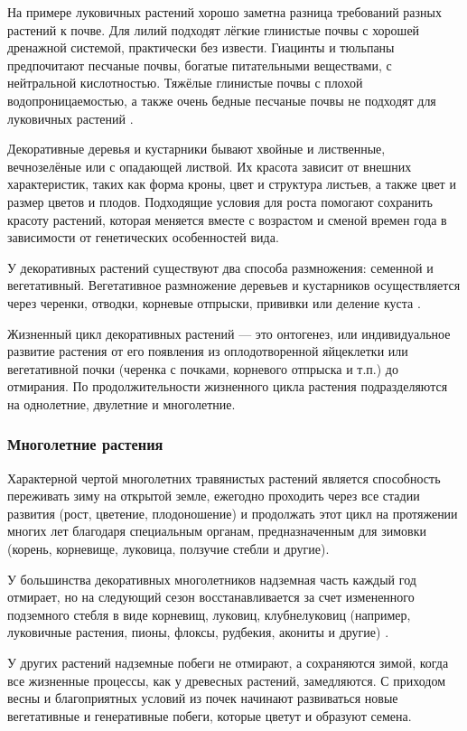 На примере луковичных растений хорошо заметна разница требований разных растений к почве. Для лилий подходят лёгкие глинистые почвы с хорошей дренажной системой, практически без извести. Гиацинты и тюльпаны предпочитают песчаные почвы, богатые питательными веществами, с нейтральной кислотностью. Тяжёлые глинистые почвы с плохой водопроницаемостью, а также очень бедные песчаные почвы не подходят для луковичных растений \cite{doroshenko}.

Декоративные деревья и кустарники бывают хвойные и лиственные, вечнозелёные или с опадающей листвой. Их красота зависит от внешних характеристик, таких как форма кроны, цвет и структура листьев, а также цвет и размер цветов и плодов. Подходящие условия для роста помогают сохранить красоту растений, которая меняется вместе с возрастом и сменой времен года в зависимости от генетических особенностей вида.

У декоративных растений существуют два способа размножения: семенной и вегетативный. Вегетативное размножение деревьев и кустарников осуществляется через черенки, отводки, корневые отпрыски, прививки или деление куста \cite{berd}.

Жизненный цикл декоративных растений — это онтогенез, или индивидуальное развитие растения от его появления из оплодотворенной яйцеклетки или вегетативной почки (черенка с почками, корневого отпрыска и т.п.) до отмирания. По продолжительности жизненного цикла растения подразделяются на однолетние, двулетние и многолетние.

\subsubsection{Многолетние растения}

Характерной чертой многолетних травянистых растений является способность переживать зиму на открытой земле, ежегодно проходить через все стадии развития (рост, цветение, плодоношение) и продолжать этот цикл на протяжении многих лет благодаря специальным органам, предназначенным для зимовки (корень, корневище, луковица, ползучие стебли и другие).

У большинства декоративных многолетников надземная часть каждый год отмирает, но на следующий сезон восстанавливается за счет измененного подземного стебля в виде корневищ, луковиц, клубнелуковиц (например, луковичные растения, пионы, флоксы, рудбекия, акониты и другие) \cite{viyginaOpen}.

У других растений надземные побеги не отмирают, а сохраняются зимой, когда все жизненные процессы, как у древесных растений, замедляются. С приходом весны и благоприятных условий из почек начинают развиваться новые вегетативные и генеративные побеги, которые цветут и образуют семена.

